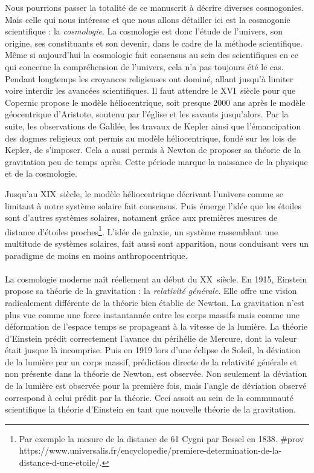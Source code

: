 \documentclass[11pt, twoside, a4paper, openright]{report}
\begin{document}
Nous pourrions passer la totalité de ce manuscrit à décrire diverses cosmogonies. Mais celle qui nous intéresse et que nous allons détailler ici est la cosmogonie scientifique : la \emph{cosmologie}. La cosmologie est donc l'étude de l'univers, son origine, ses constituants et son devenir, dans le cadre de la méthode scientifique. Même si aujourd'hui la cosmologie fait consensus au sein des scientifiques en ce qui concerne la compréhension de l'univers, cela n'a pas toujours été le cas. Pendant longtemps les croyances religieuses ont dominé, allant jusqu'à limiter voire interdir les avancées scientifiques.
Il faut attendre le \textsc{XVI}\ieme~siècle pour que Copernic propose le modèle héliocentrique, soit presque \num{2000} ans après le modèle géocentrique d'Aristote, soutenu par l'église et les savants jusqu'alors.
Par la suite, les observations de Galilée, les travaux de Kepler ainsi que l'émancipation des dogmes religieux ont permis au modèle héliocentrique, fondé sur les lois de Kepler, de s'imposer. Cela a aussi permis à Newton de proposer sa théorie de la gravitation peu de temps après. Cette période marque la naissance de la physique et de la cosmologie.

Jusqu'au \textsc{XIX}\ieme~siècle, le modèle héliocentrique décrivant l'univers comme se limitant à notre système solaire fait consensus. Puis émerge l'idée que les étoiles sont d'autres systèmes solaires, notament grâce aux premières mesures de distance d'étoiles proches\footnote{Par exemple la mesure de la distance de 61 Cygni par Bessel en 1838. \#prov https://www.universalis.fr/encyclopedie/premiere-determination-de-la-distance-d-une-etoile/.}. L'idée de galaxie, un système rassemblant une multitude de systèmes solaires, fait aussi sont apparition, nous conduisant vers un paradigme de moins en moins anthropocentrique.

\paragraph{}
La cosmologie moderne naît réellement au début du \textsc{XX}\ieme~siècle. En 1915, Einstein propose sa théorie de la gravitation : la \emph{relativité générale}. Elle offre une vision radicalement différente de la théorie bien établie de Newton. La gravitation n'est plus vue comme une force instantannée entre les corps massifs mais comme une déformation de l'espace temps se propageant à la vitesse de la lumière. La théorie d'Einstein prédit correctement l'avance du périhélie de Mercure, dont la valeur était jusque là incomprise. Puis en 1919 lors d'une éclipse de Soleil, la déviation de la lumière par un corps massif, prédiction directe de la relativité générale et non présente dans la théorie de Newton, est observée. Non seulement la déviation de la lumière est observée pour la première fois, mais l'angle de déviation observé correspond à celui prédit par la théorie. Ceci assoit au sein de la communauté scientifique la théorie d'Einstein en tant que nouvelle théorie de la gravitation.
\end{document}
